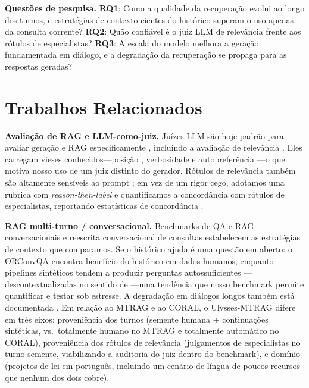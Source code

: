 \documentclass[conference]{IEEEtran}
\begin{document}
\noindent\textbf{Questões de pesquisa.}
\textbf{RQ1}: Como a qualidade da recuperação evolui ao longo dos turnos, e
estratégias de contexto cientes do histórico superam o uso apenas da consulta
corrente? \textbf{RQ2}: Quão confiável é o juiz LLM de relevância frente aos
rótulos de especialistas? \textbf{RQ3}: A escala do modelo melhora a geração
fundamentada em diálogo, e a degradação da recuperação se propaga para as
respostas geradas?

\section{Trabalhos Relacionados}
\textbf{Avaliação de RAG e LLM-como-juiz.} Juízes LLM são hoje padrão para
avaliar geração \cite{Zheng2023MTBench,Liu2023GEval,Kim2024Prometheus2} e RAG
especificamente \cite{Es2024RAGAS}, incluindo a avaliação de relevância
\cite{Thomas2024Searcher,Upadhyay2024UMBRELA,Faggioli2023Perspectives}. Eles
carregam vieses conhecidos---posição \cite{Wang2024Unfair}, verbosidade
\cite{Zheng2023MTBench} e autopreferência \cite{Panickssery2024SelfPref}---o que
motiva nosso uso de um juiz distinto do gerador. Rótulos de relevância também
são altamente sensíveis ao prompt \cite{Arabzadeh2025Prompt}; em vez de um rigor
cego, adotamos uma rubrica com \emph{reason-then-label} \cite{Liu2023GEval} e
quantificamos a concordância com rótulos de especialistas, reportando
estatísticas de concordância \cite{Calderon2025AltTest,Hashemi2024LLMRubric}.

\textbf{RAG multi-turno / conversacional.} Benchmarks de QA e RAG
conversacionais \cite{Katsis2025MTRAG,Cheng2025CORAL,Qu2020ORConvQA} e reescrita
conversacional de consultas \cite{Anantha2021QReCC,Elgohary2019CANARD,Mao2023LLM4CS}
estabelecem as estratégias de contexto que comparamos. Se o histórico ajuda é
uma questão em aberto: o ORConvQA \cite{Qu2020ORConvQA} encontra benefício do
histórico em dados humanos, enquanto pipelines sintéticos tendem a produzir
perguntas autossuficientes \cite{Vlachos2025Synthetic}---descontextualizadas no
sentido de \cite{Choi2021Decontextualization}---uma tendência que nosso
benchmark permite quantificar e testar sob estresse. A degradação em diálogos
longos também está documentada \cite{Laban2025Lost}. Em relação ao MTRAG e ao
CORAL, o Ulysses-MTRAG difere em três eixos: proveniência dos turnos (semente
humana + continuações sintéticas, vs.\ totalmente humano no MTRAG e totalmente
automático no CORAL), proveniência dos rótulos de relevância (julgamentos de
especialistas no turno-semente, viabilizando a auditoria do juiz dentro do
benchmark), e domínio (projetos de lei em português, incluindo um cenário de
língua de poucos recursos que nenhum dos dois cobre).
\end{document}
